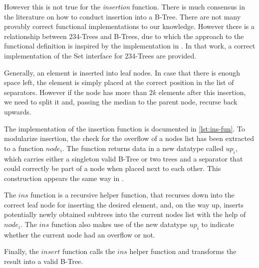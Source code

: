 However this is not true for the \textit{insertion} function.
There is much consensus in the literature on how to conduct insertion into a B-Tree.
There are not many provably correct functional implementations to our knowledge.
However there is a relationship between 234-Trees and B-Trees,
due to which the approach to the functional definition is inspired by the implementation
in \parencite{DBLP:conf/itp/Nipkow16}.
In that work, a correct implementation of the Set interface for 234-Trees 
are provided.

Generally, an element is inserted into leaf nodes.
In case that there is enough space left, the element is simply placed at the correct
position in the list of separators.
However if the node has more than $2k$ elements after this insertion,
we need to split it and, passing the median to the parent node,
recurse back upwards.

The implementation of the insertion function is documented in \autoref{lst:ins-fun}.
To modularize insertion, the check for the overflow of a nodes list has been
extracted to a function $node_i$.
The function returns data in a new datatype called $up_i$, which
carries either a singleton valid B-Tree or two trees and a separator
that could correctly be part of a node when placed next to each other.
This construction appears the same way in \parencite{DBLP:conf/itp/Nipkow16}.

The $ins$ function is a recursive helper function,
that recurses down into the correct leaf node for inserting the desired element,
and, on the way up, inserts potentially newly obtained subtrees into the
current nodes list with the help of $node_i$.
The $ins$ function also makes use of the new datatype $up_i$ to indicate whether
the current node had an overflow or not.

Finally, the $insert$ function calls the $ins$ helper function
and transforms the result into a valid B-Tree.


